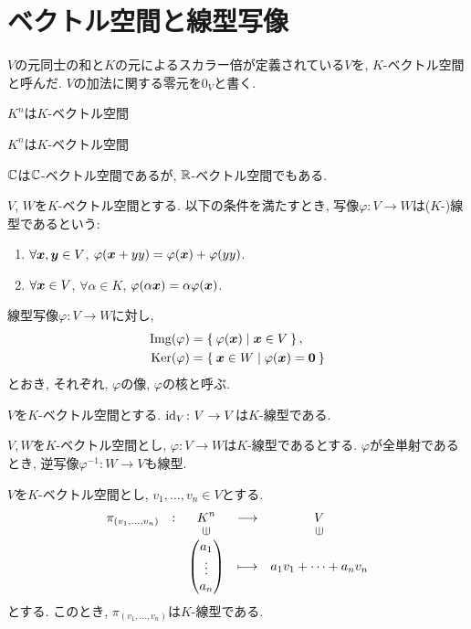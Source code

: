 \section{ベクトル空間と線型写像}

$V$の元同士の和と$K$の元によるスカラー倍が定義されている$V$を,
$K$-ベクトル空間と呼んだ.
$V$の加法に関する零元を$0_V$と書く.

\begin{example}
  $K^n$は$K$-ベクトル空間
\end{example}\begin{example}
  $K^n$は$K$-ベクトル空間
\end{example}
\begin{example}
  $\mathbb{C}$は$\mathbb{C}$-ベクトル空間であるが,
  $\mathbb{R}$-ベクトル空間でもある.
\end{example}
\begin{definition}
  $V$, $W$を$K$-ベクトル空間とする.
  以下の条件を満たすとき,
  写像$\varphi\colon V\to W$は($K$-)線型であるという:
  \begin{enumerate}
    \item $\forall \boldsymbol{x},\boldsymbol{y}\in V$, $\varphi(\boldsymbol{x}+yy)=\varphi(\boldsymbol{x})+\varphi(yy)$.
    \item $\forall \boldsymbol{x}\in V$, $\forall \alpha\in K$, $\varphi(\alpha\boldsymbol{x})=\alpha\varphi(\boldsymbol{x})$.
  \end{enumerate}
\end{definition}

\begin{definition}
  線型写像$\varphi\colon V\to W$に対し,
  \begin{align*}
    \operatorname{Img}(\varphi)&=\Set{\varphi(\boldsymbol{x})|\boldsymbol{x}\in V},\\
    \operatorname{Ker}(\varphi)&=\Set{\boldsymbol{x}\in W|\varphi(\boldsymbol{x})=\boldsymbol{0}}
  \end{align*}
  とおき, それぞれ, $\varphi$の像, $\varphi$の核と呼ぶ.
\end{definition}

\begin{example}
  $V$を$K$-ベクトル空間とする.
  $\operatorname{id}_V\colon V\to V$は$K$-線型である.
\end{example}

\begin{example}
  $V,W$を$K$-ベクトル空間とし,
  $\varphi\colon V\to W$は$K$-線型であるとする.
  $\varphi$が全単射であるとき,
  逆写像$\varphi^{-1}\colon W\to V$も線型.
\end{example}

\begin{example}
  $V$を$K$-ベクトル空間とし,
  $v_1,\ldots,v_n\in V$とする.
  \begin{align*}
    \shazo{\pi_{(v_1,\ldots,v_n)}}
          {K^n}{V}
          {\begin{pmatrix}a_1\\\vdots\\a_n\end{pmatrix}}{a_1v_1+\cdots+a_nv_n}
  \end{align*}
  とする.
  このとき, $\pi_{(v_1,\ldots,v_n)}$は$K$-線型である.
\end{example}

